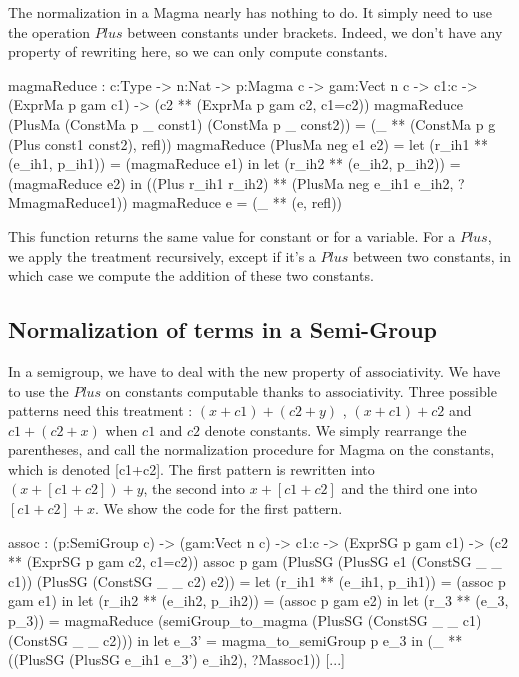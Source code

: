 \documentclass{sigplanconf}
\begin{document}
The normalization in a Magma nearly has nothing to do. It simply need to use the operation $Plus$ between constants under brackets. Indeed, we don't have any property of rewriting here, so we can only compute constants.

\begin{code}[caption=Normalization function for Magma, captionpos=b, label=lst1:haskell2]
magmaReduce : {c:Type} -> {n:Nat} 
              -> {p:Magma c} -> {gam:Vect n c} 
              -> {c1:c} -> (ExprMa p gam c1) 
              -> (c2 ** (ExprMa p gam c2, c1=c2))
magmaReduce (PlusMa
      (ConstMa p _ const1) 
      (ConstMa p _ const2)) = 
         (_ ** (ConstMa p g 
               (Plus const1 const2), refl))
magmaReduce (PlusMa neg e1 e2) = 
    let (r_ih1 ** (e_ih1, p_ih1)) 
        = (magmaReduce e1) in
    let (r_ih2 ** (e_ih2, p_ih2)) 
        = (magmaReduce e2) in
    ((Plus r_ih1 r_ih2) ** 
        (PlusMa neg e_ih1 e_ih2, ?MmagmaReduce1))                    
magmaReduce e = (_ ** (e, refl))
\end{code}

This function returns the same value for constant or for a variable. For a $Plus$, we apply the treatment recursively, except if it's a $Plus$ between two constants, in which case we compute the addition of these two constants.


	\subsection {Normalization of terms in a Semi-Group}

In a semigroup, we have to deal with the new property of associativity. We have to use the $Plus$ on constants computable thanks to associativity. Three possible patterns need this treatment : $(x+c1)+(c2+y)$ , $(x + c1) + c2$  and $c1 + (c2 + x)$ when $c1$ and $c2$ denote constants. We simply rearrange the parentheses, and call the normalization procedure for Magma on the constants, which is denoted [c1+c2].
The first pattern is rewritten into $(x + [c1+c2]) + y$, the second into $x + [c1+c2]$ and the third one into $[c1 + c2] + x$.
We show the code for the first pattern.
\begin{code}[caption=Computing with associativity in a Semi-Group, captionpos=b, label=lst1:haskell2]
assoc : (p:SemiGroup c) -> (gam:Vect n c) 
        -> {c1:c} -> (ExprSG p gam c1) 
        -> (c2 ** (ExprSG p gam c2, c1=c2))
assoc p gam (PlusSG 
             (PlusSG e1 
                        (ConstSG _ _ c1)) 
             (PlusSG (ConstSG _ _ c2) e2)) =
    let (r_ih1 ** (e_ih1, p_ih1)) 
       = (assoc p gam e1) in
    let (r_ih2 ** (e_ih2, p_ih2)) 
       = (assoc p gam e2) in
    let (r_3 ** (e_3, p_3)) 
       = magmaReduce (semiGroup_to_magma 
            (PlusSG (ConstSG _ _ c1) 
            (ConstSG _ _ c2))) in
    let e_3' = magma_to_semiGroup p e_3 in
    (_ ** ((PlusSG (PlusSG e_ih1 e_3') e_ih2), 
          ?Massoc1))
[...]
\end{code}
\end{document}
